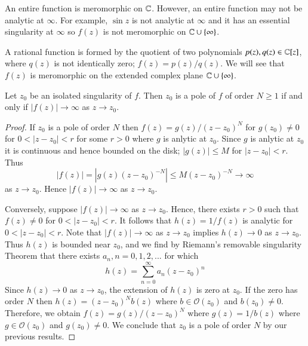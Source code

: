 \documentclass[12pt, a4paper, oneside, openright, titlepage]{book}
\begin{document}
\begin{eg}
    An entire function is meromorphic on $\mathbb C$. However, an entire function may not be analytic at $\infty$. For example, $\sin z$ is not analytic at $\infty$ and it has an essential singularity at $\infty$ so $f(z)$ is not meromorphic on $\mathbb C\cup \{\infty\}$.
\end{eg}


\begin{eg}
    A rational function is formed by the quotient of two polynomials $p(z),q(z) \in \mathbb C[z]$, where $q(z)$ is not identically zero; $f(z) = p(z)/q(z)$. We will see that $f(z)$ is meromorphic on the extended complex plane $\mathbb C\cup\{\infty\}$.
\end{eg}

\begin{thm}
    Let $z_0$ be an isolated singularity of $f$. Then $z_0$ is a pole of $f$ of order $N \geq 1$ if and only if $|f(z)| \rightarrow \infty$ as $z\rightarrow z_0$.
\end{thm}
\begin{proof}
    If $z_0$ is a pole of order $N$ then $f(z) = g(z)/(z-z_0)^N$ for $g(z_0)\neq 0$ for $0 < |z-z_0| < r$ for some $r > 0$ where $g$ is anlytic at $z_0$. Since $g$ is anlytic at $z_0$ it is continuous and hence bounded on the disk; $|g(z)| \leq M$ for $|z-z_0| < r$. Thus \begin{equation*}
        |f(z)| = |g(z)(z-z_0)^{-N}| \leq M(z-z_0)^{-N}\rightarrow \infty
    \end{equation*}
    as $z\rightarrow z_0$. Hence $|f(z)| \rightarrow \infty$ as $z\rightarrow z_0$.

    Conversely, suppose $|f(z)|\rightarrow \infty$ as $z\rightarrow z_0$. Hence, there exists $r > 0$ such that $f(z) \neq 0$ for $0 < |z-z_0| < r$. It follows that $h(z) = 1/f(z)$ is analytic for $0 < |z-z_0| < r$. Note that $|f(z)|\rightarrow \infty$ as $z\rightarrow z_0$ implies $h(z) \rightarrow 0$ as $z\rightarrow z_0$. Thus $h(z)$ is bounded near $z_0$, and we find by Riemann's removable singularity Theorem that there exists $a_n, n = 0,1,2,...$ for which \begin{equation*}
        h(z) = \sum_{n=0}^{\infty}a_n(z-z_0)^n
    \end{equation*}
    Since $h(z)\rightarrow 0$ as $z\rightarrow z_0$, the extension of $h(z)$ is zero at $z_0$. If the zero has order $N$ then $h(z) = (z-z_0)^Nb(z)$ where $b \in \mathcal{O}(z_0)$ and $b(z_0) \neq 0$. Therefore, we obtain $f(z) = g(z)/(z-z_0)^N$ where $g(z) = 1/b(z)$ where $g \in \mathcal{O}(z_0)$ and $g(z_0) \neq 0$. We conclude that $z_0$ is a pole of order $N$ by our previous results.
\end{proof}
\end{document}
